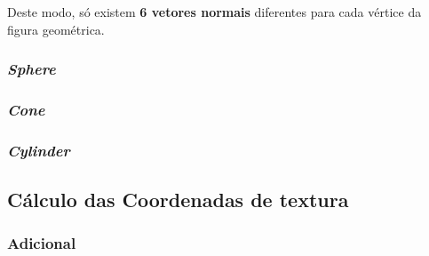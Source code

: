 \documentclass[relatorio.tex]{subfiles}
\begin{document}
Deste modo, só existem \textbf{6 vetores normais} 
diferentes para cada vértice da figura geométrica.


\subsubsection{\textit{Sphere}}

\subsubsection{\textit{Cone}}

\subsubsection{\textit{Cylinder}}


\subsection{Cálculo das Coordenadas de textura} \label{subsec:texCoord}

\subsubsection{Adicional}
\end{document}
